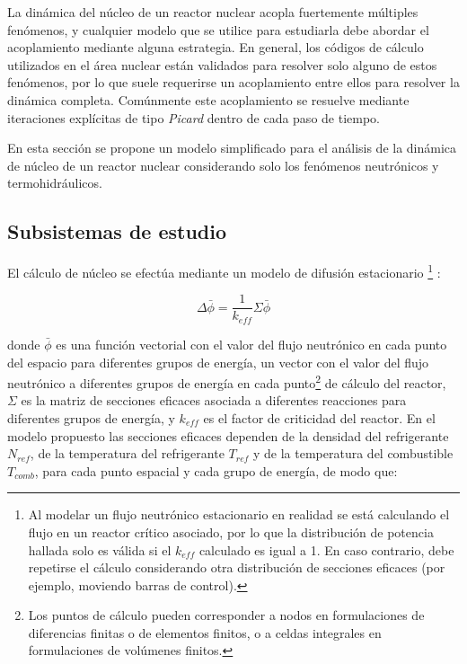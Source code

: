 La dinámica del núcleo de un reactor nuclear acopla fuertemente múltiples fenómenos, y cualquier modelo que se utilice para estudiarla debe abordar el acoplamiento mediante alguna estrategia.
En general, los códigos de cálculo utilizados en el área nuclear están validados para resolver solo alguno de estos fenómenos,
por lo que suele requerirse un acoplamiento entre ellos para resolver la dinámica completa.
Comúnmente este acoplamiento se resuelve mediante iteraciones explícitas de tipo \textit{Picard} dentro de cada paso de tiempo.

En esta sección se propone un modelo simplificado para el análisis de la dinámica de núcleo de un reactor nuclear
considerando solo los fenómenos neutrónicos y termohidráulicos.

\subsection*{Subsistemas de estudio}
\label{3:subsistemas-nt}

El cálculo de núcleo se efectúa mediante un modelo de difusión estacionario
\footnote{Al modelar un flujo neutrónico estacionario en realidad se está calculando el flujo en un reactor crítico asociado,
por lo que la distribución de potencia hallada solo es válida si el $k_{eff}$ calculado es igual a 1.
En caso contrario, debe repetirse el cálculo considerando otra distribución de secciones eficaces
(por ejemplo, moviendo barras de control).
} \cite{henry}:

\begin{equation}
\Delta \bar{\phi} = \frac{1}{k_{eff}}\Sigma \bar{\phi}
\label{eq-nucleo}
\end{equation}

donde $\bar{\phi}$ es una función vectorial con el valor del flujo neutrónico en cada punto del espacio para diferentes grupos de energía,
un vector con el valor del flujo neutrónico a diferentes grupos de energía en cada punto\footnote{
Los puntos de cálculo pueden corresponder a nodos en formulaciones de diferencias finitas o de elementos finitos, o a celdas integrales en formulaciones de volúmenes finitos.	
} de cálculo del reactor,
$\Sigma$ es la matriz de secciones eficaces asociada a diferentes reacciones para diferentes grupos de energía,
y $k_{eff}$ es el factor de criticidad del reactor.
En el modelo propuesto las secciones eficaces dependen de la densidad del refrigerante $N_{ref}$, de la temperatura del refrigerante $T_{ref}$ y de la temperatura del combustible $T_{comb}$, 
para cada punto espacial y cada grupo de energía, de modo que:

